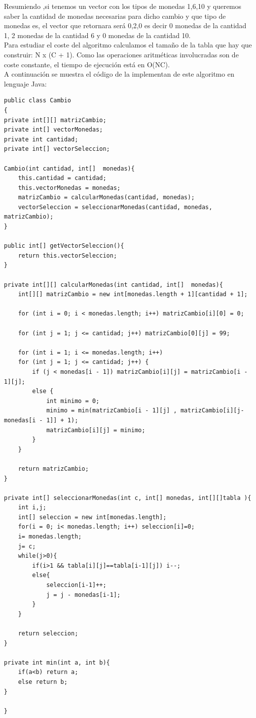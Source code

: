 	Resumiendo ,si tenemos un vector con los tipos de monedas {1,6,10} y queremos saber la cantidad de monedas necesarias para dicho cambio y que tipo de monedas es, el vector que retornara será {0,2,0} es decir 0 monedas de la cantidad 1, 2 monedas de la cantidad 6 y 0 monedas de la cantidad 10. \\
	
	Para estudiar el coste del algoritmo calculamos el tamaño de la tabla que hay que construir: N x (C + 1). Como las operaciones aritméticas involucradas son de coste constante,  el tiempo de ejecución está en O(NC). \\
	
	A continuación se muestra el código de la implementan de este algoritmo en lenguaje Java: \\
	
	\lstset{language=C}
	\begin{lstlisting}[frame=single]
public class Cambio
{
private int[][] matrizCambio;
private int[] vectorMonedas;
private int cantidad;
private int[] vectorSeleccion;

Cambio(int cantidad, int[]  monedas){
	this.cantidad = cantidad;
	this.vectorMonedas = monedas;
	matrizCambio = calcularMonedas(cantidad, monedas);
	vectorSeleccion = seleccionarMonedas(cantidad, monedas, matrizCambio);
}

public int[] getVectorSeleccion(){
	return this.vectorSeleccion;
}

private int[][] calcularMonedas(int cantidad, int[]  monedas){
	int[][] matrizCambio = new int[monedas.length + 1][cantidad + 1];

	for (int i = 0; i < monedas.length; i++) matrizCambio[i][0] = 0;
	
	for (int j = 1; j <= cantidad; j++) matrizCambio[0][j] = 99;
	
	for (int i = 1; i <= monedas.length; i++)
	for (int j = 1; j <= cantidad; j++) {
		if (j < monedas[i - 1])	matrizCambio[i][j] = matrizCambio[i - 1][j];
		else {
			int minimo = 0;
			minimo = min(matrizCambio[i - 1][j] , matrizCambio[i][j- monedas[i - 1]] + 1);
			matrizCambio[i][j] = minimo;
		}
	}

	return matrizCambio;
}

private int[] seleccionarMonedas(int c, int[] monedas, int[][]tabla ){
	int i,j;
	int[] seleccion = new int[monedas.length];
	for(i = 0; i< monedas.length; i++) seleccion[i]=0; 
	i= monedas.length;         
	j= c;         
	while(j>0){
		if(i>1 && tabla[i][j]==tabla[i-1][j]) i--;
		else{
			seleccion[i-1]++;
			j = j - monedas[i-1];
		}
	}
	
	return seleccion;
}

private int min(int a, int b){
	if(a<b)	return a;
	else return b;
}

}
	\end{lstlisting} 
	
